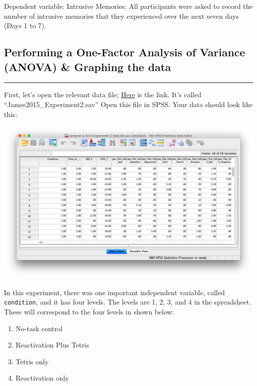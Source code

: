 \documentclass[
]{book}
\providecommand{\tightlist}{%
  \setlength{\itemsep}{0pt}\setlength{\parskip}{0pt}}
\begin{document}
Dependent variable: Intrusive Memories: All participants were asked to record the number of intrusive memories that they experienced over the next seven days (Days 1 to 7).

\hypertarget{performing-a-one-factor-analysis-of-variance-anova-graphing-the-data}{%
\subsection{Performing a One-Factor Analysis of Variance (ANOVA) \& Graphing the data}\label{performing-a-one-factor-analysis-of-variance-anova-graphing-the-data}}

\begin{center}\rule{0.5\linewidth}{0.5pt}\end{center}

First, let's open the relevant data file; \href{https://github.com/CrumpLab/statisticsLab/blob/master/data/spssdata/James2015_Experiment2.sav}{Here} is the link. It's called ``James2015\_Experiment2.sav'' Open this file in SPSS. Your data should look like this:

\includegraphics{img/8.4.11.png}

In this experiment, there was one important independent variable, called \texttt{condition}, and it has four levels. The levels are 1, 2, 3, and 4 in the spreadsheet. These will correspond to the four levels in shown below:

\begin{enumerate}
\def\labelenumi{\arabic{enumi}.}
\tightlist
\item
  No-task control
\item
  Reactivation Plus Tetris
\item
  Tetris only
\item
  Reactivation only
\end{enumerate}
\end{document}
